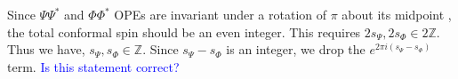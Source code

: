 \documentclass[11pt]{article}
\newcommand{\p}{\partial}
\newcommand{\mO}{\mathcal{O}}
\newcommand{\nn}{\nonumber}
\newcommand{\lb}{\left(}
\newcommand{\rb}{\right)}
\newcommand{\NL}[1]{\textcolor{blue}{#1}}
\newcommand{\JM}[1]{\textcolor{orange}{#1}}
\begin{document}
Since $\Psi \Psi^*$ and $\Phi \Phi^*$ OPEs are invariant under a rotation of $\pi$ about its midpoint \cite{calabrese2011entanglement}, the total conformal spin should be an even integer. This requires $2s_\Psi, 2s_\Phi \in 2\mathbb{Z}$. Thus we have, $s_\Psi, s_\Phi \in \mathbb{Z}$. 
Since 
$s_\Psi-s_\Phi$
is an integer, we drop the 
$e^{2\pi i (s_\Psi-s_\Phi)}$ 
term. \NL{Is this statement correct?}


\end{document}
